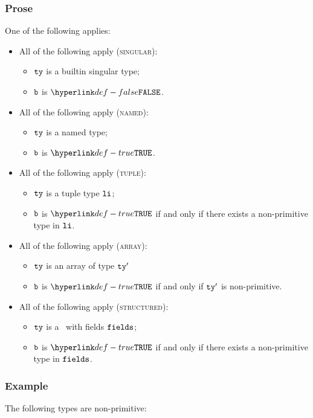 \subsubsection{Prose}
One of the following applies:
\begin{itemize}
  \item All of the following apply (\textsc{singular}):
  \begin{itemize}
  \item $\texttt{ty}$ is a builtin singular type;
  \item $\texttt{b}$ is $\False$.
  \end{itemize}
  \item All of the following apply (\textsc{named}):
  \begin{itemize}
    \item $\texttt{ty}$ is a named type;
    \item $\texttt{b}$ is $\True$.
  \end{itemize}
  \item All of the following apply (\textsc{tuple}):
  \begin{itemize}
    \item $\texttt{ty}$ is a tuple type $\texttt{li}$;
    \item $\texttt{b}$ is $\True$ if and only if there exists a non-primitive type in $\texttt{li}$.
  \end{itemize}
  \item All of the following apply (\textsc{array}):
    \begin{itemize}
    \item $\texttt{ty}$ is an array of type $\texttt{ty}'$
    \item $\texttt{b}$ is $\True$ if and only if $\texttt{ty}'$ is non-primitive.
    \end{itemize}
  \item All of the following apply (\textsc{structured}):
    \begin{itemize}
    \item $\texttt{ty}$ is a \structuredtype\ with fields $\texttt{fields}$;
    \item $\texttt{b}$ is $\True$ if and only if there exists a non-primitive type in $\texttt{fields}$.
    \end{itemize}
\end{itemize}

\subsubsection{Example}
The following types are non-primitive:

